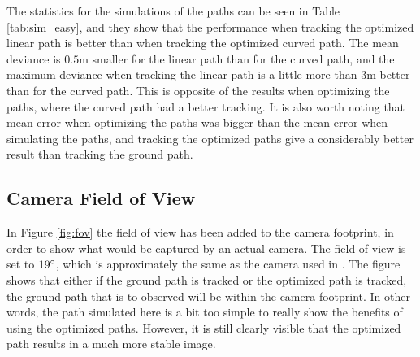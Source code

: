 The statistics for the simulations of the paths can be seen in Table \ref{tab:sim_easy}, and they show that the performance when tracking the optimized linear path is better than when tracking the optimized curved path. The mean deviance is $0.5$m smaller for the linear path than for the curved path, and the maximum deviance when tracking the linear path is a little more than $3$m better than for the curved path. This is opposite of the results when optimizing the paths, where the curved path had a better tracking. It is also worth noting that mean error when optimizing the paths was bigger than the mean error when simulating the paths, and tracking the optimized paths give a considerably better result than tracking the ground path.


\subsection{Camera Field of View}

In Figure \ref{fig:fov} the field of view has been added to the camera footprint, in order to show what would be captured by an actual camera. The field of view is set to $19\degree$, which is approximately the same as the camera used in \cite{hymsySUOMALAINEN}. The figure shows that either if the ground path is tracked or the optimized path is tracked, the ground path that is to observed will be within the camera footprint. In other words, the path simulated here is a bit too simple to really show the benefits of using the optimized paths. However, it is still clearly visible that the optimized path results in a much more stable image.

